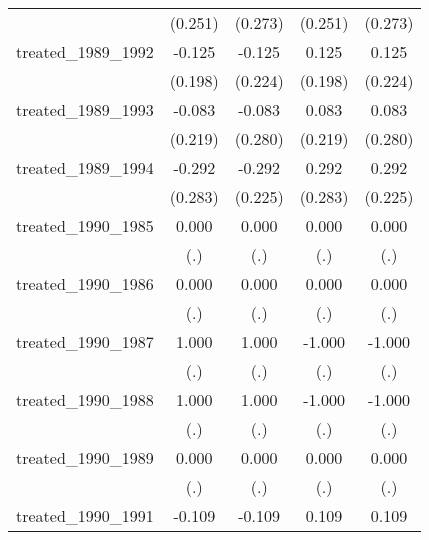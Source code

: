 {\begin{tabular}{l*{4}{c}}
            &     (0.251)         &     (0.273)         &     (0.251)         &     (0.273)         \\
[1em]
treated\_1989\_1992&      -0.125         &      -0.125         &       0.125         &       0.125         \\
            &     (0.198)         &     (0.224)         &     (0.198)         &     (0.224)         \\
[1em]
treated\_1989\_1993&      -0.083         &      -0.083         &       0.083         &       0.083         \\
            &     (0.219)         &     (0.280)         &     (0.219)         &     (0.280)         \\
[1em]
treated\_1989\_1994&      -0.292         &      -0.292         &       0.292         &       0.292         \\
            &     (0.283)         &     (0.225)         &     (0.283)         &     (0.225)         \\
[1em]
treated\_1990\_1985&       0.000         &       0.000         &       0.000         &       0.000         \\
            &         (.)         &         (.)         &         (.)         &         (.)         \\
[1em]
treated\_1990\_1986&       0.000         &       0.000         &       0.000         &       0.000         \\
            &         (.)         &         (.)         &         (.)         &         (.)         \\
[1em]
treated\_1990\_1987&       1.000         &       1.000         &      -1.000         &      -1.000         \\
            &         (.)         &         (.)         &         (.)         &         (.)         \\
[1em]
treated\_1990\_1988&       1.000         &       1.000         &      -1.000         &      -1.000         \\
            &         (.)         &         (.)         &         (.)         &         (.)         \\
[1em]
treated\_1990\_1989&       0.000         &       0.000         &       0.000         &       0.000         \\
            &         (.)         &         (.)         &         (.)         &         (.)         \\
[1em]
treated\_1990\_1991&      -0.109         &      -0.109         &       0.109         &       0.109         \\

\end{tabular}}
